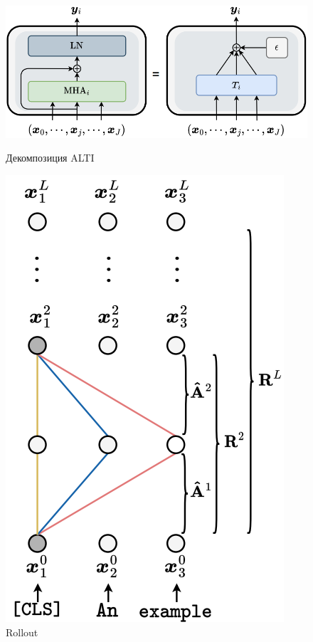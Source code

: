 \begin{figure}[h]
    \centering
    \begin{minipage}{0.55\textwidth}
        \centering
        \includegraphics[width=\textwidth]{pictures/alti1.png}
        \caption{Декомпозиция ALTI}
        \label{fig:image1}
    \end{minipage}
    \begin{minipage}{0.3\textwidth}
        \centering
        \includegraphics[width=\textwidth]{pictures/alti2.png}
        \caption{Rollout}
        \label{fig:image2}
    \end{minipage}
\end{figure}

